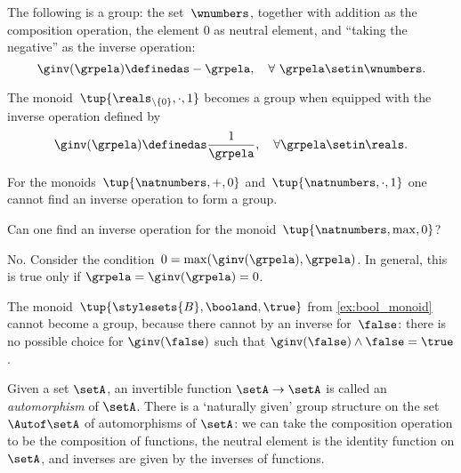 \begin{example}
    The following is a group: the set~$\wnumbers$, together with addition as the composition operation, the element $0$ as neutral element, and ``taking the negative'' as the inverse operation:
    \begin{equation}
        \ginv(\grpela) \definedas -\grpela, \quad \forall \ \grpela \setin \wnumbers.
    \end{equation}
\end{example}
\begin{example}
    The monoid~$\tup{\reals_{\backslash \{ 0 \}}, \cdot, 1}$ becomes a group when equipped with the inverse operation defined by
    \begin{equation}
        \ginv(\grpela) \definedas \frac{1}{\grpela}, \quad \forall \grpela \setin \reals.
    \end{equation}
\end{example}

\begin{example}
    For the monoids~$\tup{\natnumbers, +,0}$ and~$\tup{\natnumbers,\cdot ,1}$ one cannot find an inverse operation to form a group.
\end{example}

\begin{exercise}
    Can one find an inverse operation for the monoid~$\tup{\natnumbers,\max,0}$?
\end{exercise}
%
\begin{solution}
    No.
    Consider the condition~$0=\max(\ginv(\grpela),\grpela)$.
    In general, this is true only if $\grpela=\ginv(\grpela)=0$.
\end{solution}

\begin{example}
    The monoid~$\tup{\stylesets{B},\booland, \true}$ from \cref{ex:bool_monoid} cannot become a group, because there cannot by an inverse for~$\false$: there is no possible choice for $\ginv(\false)$ such that $\ginv(\false)\wedge \false=\true$.
\end{example}

\begin{example}
Given a set $\setA$, an invertible function $\setA \to \setA$ is called an \emph{automorphism} of $\setA$. There is a `naturally given' group structure on the set $\Autof\setA$ of automorphisms of $\setA$: we can take the composition operation to be the composition of functions, the neutral element is the identity function on $\setA$, and inverses are given by the inverses of functions.
\end{example}

